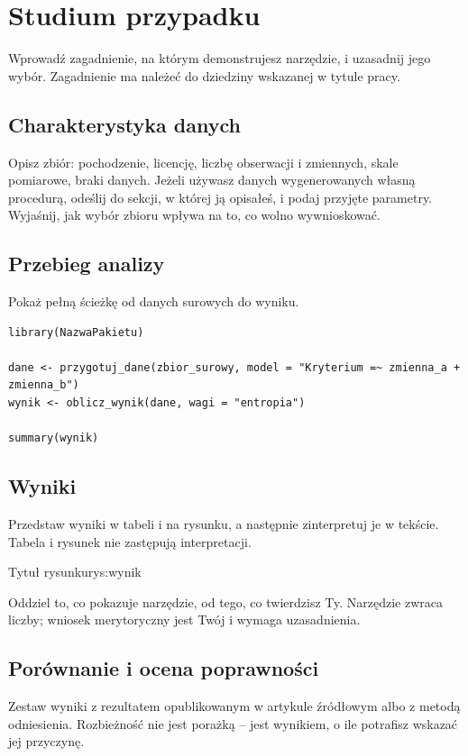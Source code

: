\chapter{Studium przypadku}


Wprowadź zagadnienie, na którym demonstrujesz narzędzie, i uzasadnij jego wybór. Zagadnienie ma należeć do dziedziny wskazanej w tytule pracy.

\section{Charakterystyka danych}

Opisz zbiór: pochodzenie, licencję, liczbę obserwacji i zmiennych, skale pomiarowe, braki danych. Jeżeli używasz danych wygenerowanych własną procedurą, odeślij do sekcji, w której ją opisałeś, i podaj przyjęte parametry. Wyjaśnij, jak wybór zbioru wpływa na to, co wolno wywnioskować.

\section{Przebieg analizy}

Pokaż pełną ścieżkę od danych surowych do wyniku.

\begin{lstlisting}[caption={Przebieg analizy z uzyciem pakietu},label={lst:analiza}]
library(NazwaPakietu)

dane <- przygotuj_dane(zbior_surowy, model = "Kryterium =~ zmienna_a + zmienna_b")
wynik <- oblicz_wynik(dane, wagi = "entropia")

summary(wynik)
\end{lstlisting}

\section{Wyniki}

Przedstaw wyniki w tabeli i na rysunku, a następnie zinterpretuj je w tekście. Tabela i rysunek nie zastępują interpretacji.

\begin{rysunekepi}{Tytuł rysunku}{rys:wynik}
\end{rysunekepi}

Oddziel to, co pokazuje narzędzie, od tego, co twierdzisz Ty. Narzędzie zwraca liczby; wniosek merytoryczny jest Twój i wymaga uzasadnienia.

\section{Porównanie i ocena poprawności}

Zestaw wyniki z rezultatem opublikowanym w artykule źródłowym albo z metodą odniesienia. Rozbieżność nie jest porażką – jest wynikiem, o ile potrafisz wskazać jej przyczynę.
